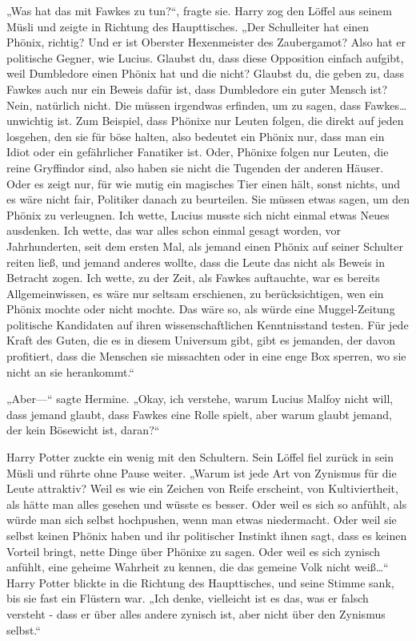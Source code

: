 {„Was hat das mit Fawkes zu tun?“, fragte sie. Harry zog den Löffel aus seinem Müsli und zeigte in Richtung des Haupttisches. „Der Schulleiter hat einen Phönix, richtig? Und er ist Oberster Hexenmeister des Zaubergamot? Also hat er politische Gegner, wie Lucius. Glaubst du, dass diese Opposition einfach aufgibt, weil Dumbledore einen Phönix hat und die nicht? Glaubst du, die geben zu, dass Fawkes auch nur ein Beweis dafür ist, dass Dumbledore ein guter Mensch ist? Nein, natürlich nicht. Die müssen irgendwas erfinden, um zu sagen, dass Fawkes… unwichtig ist. Zum Beispiel, dass Phönixe nur Leuten folgen, die direkt auf jeden losgehen, den sie für böse halten, also bedeutet ein Phönix nur, dass man ein Idiot oder ein gefährlicher Fanatiker ist. Oder, Phönixe folgen nur Leuten, die reine Gryffindor sind, also haben sie nicht die Tugenden der anderen Häuser. Oder es zeigt nur, für wie mutig ein magisches Tier einen hält, sonst nichts, und es wäre nicht fair, Politiker danach zu beurteilen. Sie müssen etwas sagen, um den Phönix zu verleugnen. Ich wette, Lucius musste sich nicht einmal etwas Neues ausdenken. Ich wette, das war alles schon einmal gesagt worden, vor Jahrhunderten, seit dem ersten Mal, als jemand einen Phönix auf seiner Schulter reiten ließ, und jemand anderes wollte, dass die Leute das nicht als Beweis in Betracht zogen. Ich wette, zu der Zeit, als Fawkes auftauchte, war es bereits Allgemeinwissen, es wäre nur seltsam erschienen, zu berücksichtigen, wen ein Phönix mochte oder nicht mochte. Das wäre so, als würde eine Muggel-Zeitung politische Kandidaten auf ihren wissenschaftlichen Kenntnisstand testen. Für jede Kraft des Guten, die es in diesem Universum gibt, gibt es jemanden, der davon profitiert, dass die Menschen sie missachten oder in eine enge Box sperren, wo sie nicht an sie herankommt.“

„Aber—“ sagte Hermine. „Okay, ich verstehe, warum Lucius Malfoy nicht will, dass jemand glaubt, dass Fawkes eine Rolle spielt, aber warum glaubt jemand, der kein Bösewicht ist, daran?“

Harry Potter zuckte ein wenig mit den Schultern. Sein Löffel fiel zurück in sein Müsli und rührte ohne Pause weiter. „Warum ist jede Art von Zynismus für die Leute attraktiv? Weil es wie ein Zeichen von Reife erscheint, von Kultiviertheit, als hätte man alles gesehen und wüsste es besser. Oder weil es sich so anfühlt, als würde man sich selbst hochpushen, wenn man etwas niedermacht. Oder weil sie selbst keinen Phönix haben und ihr politischer Instinkt ihnen sagt, dass es keinen Vorteil bringt, nette Dinge über Phönixe zu sagen. Oder weil es sich zynisch anfühlt, eine geheime Wahrheit zu kennen, die das gemeine Volk nicht weiß…“ Harry Potter blickte in die Richtung des Haupttisches, und seine Stimme sank, bis sie fast ein Flüstern war. „Ich denke, vielleicht ist es das, was er falsch versteht - dass er über alles andere zynisch ist, aber nicht über den Zynismus selbst.“

}
